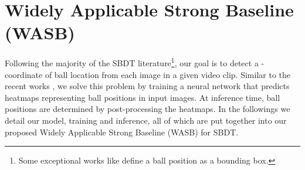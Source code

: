 \documentclass{bmvc2k}
\begin{document}
\section{Widely Applicable Strong Baseline (WASB)}
\label{sec:method}
Following the majority of the SBDT literature\footnote{Some exceptional works like \cite{zhang+2022arxiv} define a ball position as a bounding box.}, our goal is to detect a -coordinate of ball location from each image in a given video clip.
Similar to the recent works \cite{komorowski+2019mva,komorowski+2019visapp,zandycke+2019mmsports,sun+2020icpai,huang+2019avss,liu+2022cvprw}, we solve this problem by training a neural network that predicts heatmaps representing ball positions in input images.
At inference time, ball positions are determined by post-processing the heatmaps.
In the followings we detail our model, training and inference, all of which are put together into our proposed Widely Applicable Strong Baseline (WASB) for SBDT.
\end{document}
